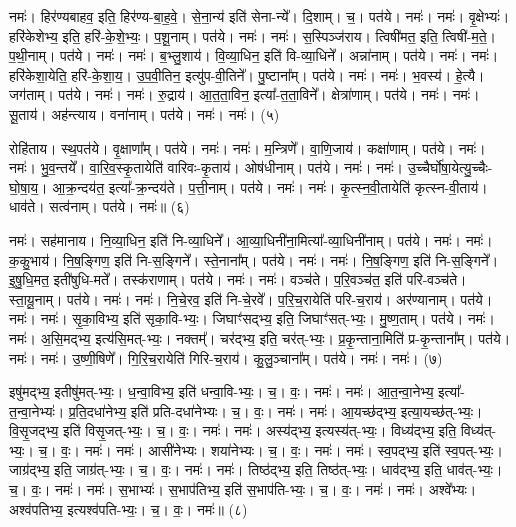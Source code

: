 नमः॑। हिर॑ण्यबाहव॒ इति॒ हिर॑ण्य-बा॒ह॒वे॒। से॒ना॒न्य॑ इति॑ सेना-न्ये᳚। दि॒शाम्। च॒। पत॑ये। नमः॑। 
नमः॑। वृ॒क्षेभ्यः॑। हरि॑केशेभ्य॒ इति॒ हरि॑-के॒शे॒भ्यः॒। प॒शू॒नाम्। पत॑ये। नमः॑। 
नमः॑। स॒स्पिञ्ज॑राय। त्विषी॑मत॒ इति॒ त्विषी॑-म॒ते॒। प॒थी॒नाम्। पत॑ये। नमः॑। 
नमः॑। ब॒भ्लु॒शाय॑। वि॒व्या॒धिन॒ इति॑ वि-व्या॒धिने᳚। अन्ना॑नाम्। पत॑ये। नमः॑। 
नमः॑। हरि॑केशा॒येति॒ हरि॑-के॒शा॒य॒। उ॒प॒वी॒तिन॒ इत्यु॑प-वी॒तिने᳚। पु॒ष्टाना᳚म्। पत॑ये। नमः॑। 
नमः॑। भ॒वस्य॑। हे॒त्यै। जग॑ताम्। पत॑ये। नमः॑। 
नमः॑। रु॒द्राय॑। आ॒त॒ता॒विन॒ इत्या᳚-त॒ता॒विने᳚। क्षेत्रा॑णाम्। पत॑ये। नमः॑। 
नमः॑। सू॒ताय॑। अह॑न्त्याय। वना॑नाम्। पत॑ये। नमः॑। 
नमः॑। (५)


रोहि॑ताय। स्थ॒पत॑ये। वृ॒क्षाणा᳚म्। पत॑ये। नमः॑। 
नमः॑। म॒न्त्रिणे᳚। वा॒णि॒जाय॑। कक्षा॑णाम्। पत॑ये। नमः॑। 
नमः॑। भु॒व॒न्तये᳚। वा॒रि॒व॒स्कृ॒तायेति॑ वारिवः-कृ॒ताय॑। ओष॑धीनाम्। पत॑ये। नमः॑। 
नमः॑। उ॒च्चैर्घो॑षा॒येत्यु॒च्चैः-घो॒षा॒य॒। आ॒क्र॒न्दय॑त॒ इत्या᳚-क्र॒न्दय॑ते। प॒त्ती॒नाम्। पत॑ये। नमः॑। 
नमः॑। कृ॒त्स्न॒वी॒तायेति॑ कृत्स्न-वी॒ताय॑। धाव॑ते। सत्व॑नाम्। पत॑ये। नमः॑॥ (६)


नमः॑। सह॑मानाय। नि॒व्या॒धिन॒ इति॑ नि-व्या॒धिने᳚। आ॒व्या॒धिनी॑ना॒मित्या᳚-व्या॒धिनी॑नाम्। पत॑ये। नमः॑। 
नमः॑। क॒कु॒भाय॑। नि॒ष॒ङ्गिण॒ इति॑ नि-स॒ङ्गिने᳚। स्ते॒नाना᳚म्। पत॑ये। नमः॑। 
नमः॑। नि॒ष॒ङ्गिण॒ इति॑ नि-स॒ङ्गिने᳚। इ॒षु॒धि॒मत॒ इती॑षुधि-मते᳚। तस्क॑राणाम्। पत॑ये। नमः॑। 
नमः॑। वञ्च॑ते। प॒रि॒वञ्च॑त॒ इति॑ परि-वञ्च॑ते। स्ता॒यू॒नाम्। पत॑ये। नमः॑। 
नमः॑। नि॒चे॒रव॒ इति॑ नि-चे॒रवे᳚। प॒रि॒च॒रायेति॑ परि-च॒राय॑। अर॑ण्यानाम्। पत॑ये। नमः॑। 
नमः॑। सृ॒का॒विभ्य॒ इति॑ सृका॒वि-भ्यः॒। जिघाꣳ॑सद्भ्य॒ इति॒ जिघाꣳ॑सत्-भ्यः॒। मु॒ष्ण॒ताम्। पत॑ये। नमः॑। 
नमः॑। अ॒सि॒मद्भ्य॒ इत्य॑सि॒मत्-भ्यः॒। नक्तम्᳚। चर॑द्भ्य॒ इति॒ चर॑त्-भ्यः॒। प्र॒कृ॒न्ताना॒मिति॑ प्र-कृ॒न्ताना᳚म्। पत॑ये। नमः॑। 
नमः॑। उ॒ष्णी॒षिणे᳚। गि॒रि॒च॒रायेति॑ गिरि-च॒राय॑। कु॒लु॒ञ्चाना᳚म्। पत॑ये। नमः॑। नमः॑। (७)


इषु॑मद्भ्य॒ इतीषु॑मत्-भ्यः॒। ध॒न्वा॒विभ्य॒ इति॑ धन्वा॒वि-भ्यः॒। च॒। वः॒। नमः॑। 
नमः॑। आ॒त॒न्वा॒नेभ्य॒ इत्या᳚-त॒न्वा॒नेभ्यः॑। प्र॒ति॒दधा॑नेभ्य॒ इति॑ प्रति-दधा॑नेभ्यः। च॒। वः॒। नमः॑। 
नमः॑। आ॒यच्छ॑द्भ्य॒ इत्या॒यच्छ॑त्-भ्यः॒। वि॒सृ॒जद्भ्य॒ इति॑ विसृ॒जत्-भ्यः॒। च॒। वः॒। नमः॑। 
नमः॑। अस्य॑द्भ्य॒ इत्यस्य॑त्-भ्यः॒। विध्य॑द्भ्य॒ इति॒ विध्य॑त्-भ्यः॒। च॒। वः॒। नमः॑। 
नमः॑। आसी॑नेभ्यः। शया॑नेभ्यः। च॒। वः॒। नमः॑। 
नमः॑। स्व॒पद्भ्य॒ इति॑ स्व॒पत्-भ्यः॒। जाग्र॑द्भ्य॒ इति॒ जाग्र॑त्-भ्यः॒। च॒। वः॒। नमः॑। 
नमः॑। तिष्ठ॑द्भ्य॒ इति॒ तिष्ठ॑त्-भ्यः॒। धाव॑द्भ्य॒ इति॒ धाव॑त्-भ्यः॒। च॒। वः॒। नमः॑। 
नमः॑। स॒भाभ्यः॑। स॒भाप॑तिभ्य॒ इति॑ स॒भाप॑ति-भ्यः॒। च॒। वः॒। नमः॑। 
नमः॑। अश्वे᳚भ्यः। अश्व॑पतिभ्य॒ इत्यश्व॑पति-भ्यः॒। च॒। वः॒। नमः॑॥ (८)


